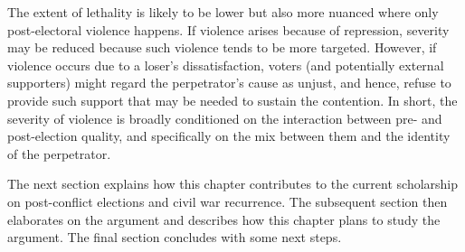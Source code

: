 \documentclass [11pt]{article}
\begin{document}
The extent of lethality is likely to be lower but also more nuanced where only post-electoral violence happens. If violence arises because of repression, severity may be reduced because such violence tends to be more targeted. However, if violence occurs due to a loser's dissatisfaction, voters (and potentially external supporters) might regard the perpetrator's cause as unjust, and hence, refuse to provide such support that may be needed to sustain the contention. In short, the severity of violence is broadly conditioned on the interaction between pre- and post-election quality, and specifically on the mix between them and the identity of the perpetrator.


The next section explains how this chapter contributes to the current scholarship on post-conflict elections and civil war recurrence. The subsequent section then elaborates on the argument and describes how this chapter plans to study the argument. The final section concludes with some next steps.
\end{document}
